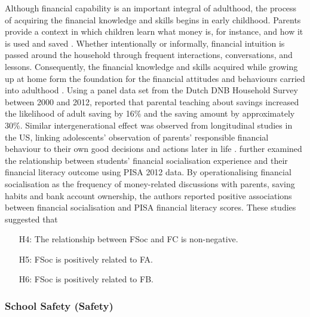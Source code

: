 Although financial capability is an important integral of adulthood, the process of acquiring the financial knowledge and skills begins in early childhood. Parents provide a context in which children learn what money is, for instance, and how it is used and saved \citep{birbili:2015}. Whether intentionally or informally, financial intuition is passed around the household through frequent interactions, conversations, and lessons. Consequently, the financial knowledge and skills acquired while growing up at home form the foundation for the financial attitudes and behaviours carried into adulthood \citep{serido:2016}. Using a panel data set from the Dutch DNB Household Survey between 2000 and 2012, \citet{bucciol:2014} reported that parental teaching about savings increased the likelihood of adult saving by 16\% and the saving amount by approximately 30\%. Similar intergenerational effect was observed from longitudinal studies in the US, linking adolescents' observation of parents' responsible financial behaviour to their own good decisions and actions later in life \citep{tang:2017}. \citet{morenoherrero:2018a} further examined the relationship between students' financial socialisation experience and their financial literacy outcome using PISA 2012 data. By operationalising financial socialisation as the frequency of money-related discussions with parents, saving habits and bank account ownership, the authors reported positive associations between financial socialisation and PISA financial literacy scores. These studies suggested that
\begin{itemize}
    \item[H4:] The relationship between FSoc and FC is non-negative.
    \item[H5:] FSoc is positively related to FA.
    \item[H6:] FSoc is positively related to FB.
\end{itemize}

\subsubsection{School Safety (Safety)}

